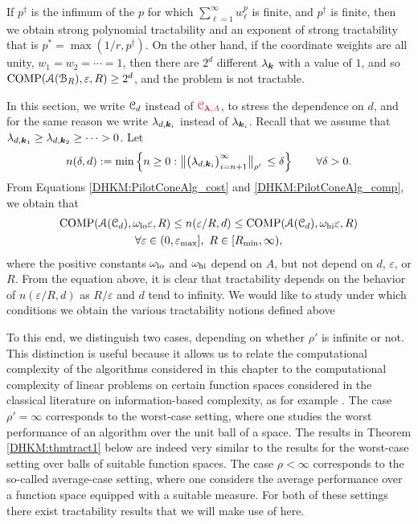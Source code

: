\documentclass[USenglish]{article}
\theoremstyle{dgthm}
\theoremstyle{dgthm}
\theoremstyle{dgthm}
\theoremstyle{dgthm}
\theoremstyle{dgdef}
\theoremstyle{definition}
\DeclareMathOperator{\COMP}{COMP}
\newcommand{\bignorm}[2][{}]{\ensuremath{\bigl \lVert #2 \bigr \rVert}_{#1}}
\newcommand{\DHKMchange}[1]{{\color{red}{#1}}}
\begin{document}
{If $p^\dagger$ is the infimum of the $p$ for which $\sum_{\ell = 1}^{\infty} w_\ell^{p}$ is finite, and $p^\dagger$ is finite, then we obtain strong polynomial tractability and an exponent of strong tractability that is $p^* = \max(1/r,p^\dagger)$. On the other hand, if the coordinate weights are all unity,  $w_1 = w_2 = \cdots = 1$, then there are $2^d$ different $\lambda_{{\boldsymbol{k}}}$ with a value of $1$, and so $\COMP(\calA(\calB_{R}),\varepsilon,R) \ge 2^d$, and the problem is not tractable.
}

In this section, we write ${\mathcal{C}}_d$ instead of $\DHKMchange{\calC_{\boldsymbol{\lambda},A}}$, to stress the dependence on $d$, and for the same reason we write $\lambda_{d,{\boldsymbol{k}}_i}$ instead of $\lambda_{{\boldsymbol{k}}_i}$. Recall that we assume that 
$\lambda_{d,{\boldsymbol{k}}_1}\geq \lambda_{d,{\boldsymbol{k}}_2}\geq \cdots >0$. Let 
\[
n(\delta,d) :=\min \left \{n\ge 0: \bignorm[\rho']{\bigl(  \lambda_{d,\bsk_i}  \bigr)_{i = n+1}^{\infty}} \,
    \le \delta \right \} \qquad \forall \delta > 0.
\]
From 
Equations \eqref{DHKM:PilotConeAlg_cost} and \eqref{DHKM:PilotConeAlg_comp}, we obtain that 
\begin{multline*}
     \COMP(\calA(\calC_d),\omega_{\textup{lo}} \varepsilon,R) \le n(\varepsilon/R,d) \le 
        \COMP(\calA(\calC_d),\omega_{\textup{hi}} \varepsilon,R)  \\
        \forall \varepsilon \in (0, \varepsilon_{\max}], \ R \in [R_{\min}, \infty),
\end{multline*}
where the positive constants $\omega_{\textup{lo}}$ and $\omega_{\textup{hi}}$  depend on $A$, but not depend on $d$, $\varepsilon$, or $R$.  From the equation above, it is clear that tractability depends on the behavior of $n(\varepsilon/R,d)$ as $R/\varepsilon$ and $d$ tend to infinity. We would like to study under which conditions we obtain the various tractability notions defined above

To this end, we distinguish two cases, depending on whether $\rho'$ is infinite or not. This 
distinction is useful because it allows us to relate the computational complexity of the algorithms 
considered in this chapter to the computational complexity of linear problems on certain function spaces considered in the classical literature on information-based complexity, as for example \cite{NovWoz08a}. The case $\rho'=\infty$ corresponds to the
worst-case setting, where one studies the worst performance of an algorithm over the unit ball of 
a space. The results in Theorem \ref{DHKM:thmtract1} below are indeed very similar to the results 
for the worst-case setting over balls of suitable function spaces. The case $\rho<\infty$ corresponds to the so-called average-case setting, where one 
considers the average performance over a function space equipped with a suitable measure. 
For both of these settings there exist tractability results that we will make use of here.
\end{document}

